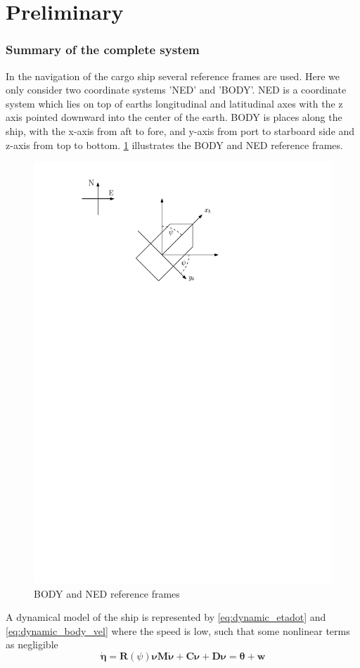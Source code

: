 \section*{Preliminary}\label{sec:preliminary}

\subsubsection*{Summary of the complete system}
In the navigation of the cargo ship several reference frames are used. Here we only consider two coordinate systems 'NED' and 'BODY'. NED is a coordinate system which lies on top of earths longitudinal and latitudinal axes with the z axis pointed downward into the center of the earth. BODY is places along the ship, with the x-axis from aft to fore, and y-axis from port to starboard side and z-axis from top to bottom. \cref{fig:boat_coordsys} illustrates the BODY and NED reference frames.
\begin{figure}[H]
    \centering
    \includegraphics[width=0.5\linewidth]{Figures/boat_figure.pdf}
    \caption{BODY and NED reference frames}
    \label{fig:boat_coordsys}
\end{figure}
A dynamical model of the ship is represented by \cref{eq:dynamic_etadot} and \cref{eq:dynamic_body_vel} where the speed is low, such that some nonlinear terms as negligible
\begin{subequations}
    \begin{equation} \label{eq:dynamic_etadot}
        \dot{\boldsymbol{\eta}} = \boldsymbol{R}(\psi)\boldsymbol{\nu}
    \end{equation} 
    \begin{equation} \label{eq:dynamic_body_vel}
        \boldsymbol{M\dot{\nu} + C\nu + D\nu = \theta} + \textbf{w}
    \end{equation}
\end{subequations}
